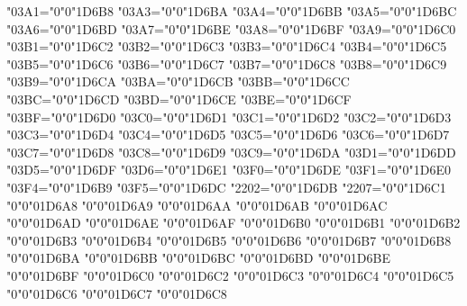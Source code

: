 {    \Umathcode"03A1="0"0"1D6B8%
    \Umathcode"03A3="0"0"1D6BA%
    \Umathcode"03A4="0"0"1D6BB%
    \Umathcode"03A5="0"0"1D6BC%
    \Umathcode"03A6="0"0"1D6BD%
    \Umathcode"03A7="0"0"1D6BE%
    \Umathcode"03A8="0"0"1D6BF%
    \Umathcode"03A9="0"0"1D6C0%
    \Umathcode"03B1="0"0"1D6C2%
    \Umathcode"03B2="0"0"1D6C3%
    \Umathcode"03B3="0"0"1D6C4%
    \Umathcode"03B4="0"0"1D6C5%
    \Umathcode"03B5="0"0"1D6C6%
    \Umathcode"03B6="0"0"1D6C7%
    \Umathcode"03B7="0"0"1D6C8%
    \Umathcode"03B8="0"0"1D6C9%
    \Umathcode"03B9="0"0"1D6CA%
    \Umathcode"03BA="0"0"1D6CB%
    \Umathcode"03BB="0"0"1D6CC%
    \Umathcode"03BC="0"0"1D6CD%
    \Umathcode"03BD="0"0"1D6CE%
    \Umathcode"03BE="0"0"1D6CF%
    \Umathcode"03BF="0"0"1D6D0%
    \Umathcode"03C0="0"0"1D6D1%
    \Umathcode"03C1="0"0"1D6D2%
    \Umathcode"03C2="0"0"1D6D3%
    \Umathcode"03C3="0"0"1D6D4%
    \Umathcode"03C4="0"0"1D6D5%
    \Umathcode"03C5="0"0"1D6D6%
    \Umathcode"03C6="0"0"1D6D7%
    \Umathcode"03C7="0"0"1D6D8%
    \Umathcode"03C8="0"0"1D6D9%
    \Umathcode"03C9="0"0"1D6DA%
    \Umathcode"03D1="0"0"1D6DD%
    \Umathcode"03D5="0"0"1D6DF%
    \Umathcode"03D6="0"0"1D6E1%
    \Umathcode"03F0="0"0"1D6DE%
    \Umathcode"03F1="0"0"1D6E0%
    \Umathcode"03F4="0"0"1D6B9%
    \Umathcode"03F5="0"0"1D6DC%
    \Umathcode"2202="0"0"1D6DB%
    \Umathcode"2207="0"0"1D6C1%
    \Umathchardef\Alpha     "0"0"01D6A8%
    \Umathchardef\Beta      "0"0"01D6A9%
    \Umathchardef\Gamma     "0"0"01D6AA%
    \Umathchardef\Delta     "0"0"01D6AB%
    \Umathchardef\Epsilon   "0"0"01D6AC%
    \Umathchardef\Zeta      "0"0"01D6AD%
    \Umathchardef\Eta       "0"0"01D6AE%
    \Umathchardef\Theta     "0"0"01D6AF%
    \Umathchardef\Iota      "0"0"01D6B0%
    \Umathchardef\Kappa     "0"0"01D6B1%
    \Umathchardef\Lambda    "0"0"01D6B2%
    \Umathchardef\Mu        "0"0"01D6B3%
    \Umathchardef\Nu        "0"0"01D6B4%
    \Umathchardef\Xi        "0"0"01D6B5%
    \Umathchardef\Omicron   "0"0"01D6B6%
    \Umathchardef\Pi        "0"0"01D6B7%
    \Umathchardef\Rho       "0"0"01D6B8%
    \Umathchardef\Sigma     "0"0"01D6BA%
    \Umathchardef\Tau       "0"0"01D6BB%
    \Umathchardef\Upsilon   "0"0"01D6BC%
    \Umathchardef\Phi       "0"0"01D6BD%
    \Umathchardef\Chi       "0"0"01D6BE%
    \Umathchardef\Psi       "0"0"01D6BF%
    \Umathchardef\Omega     "0"0"01D6C0%
    \Umathchardef\alpha     "0"0"01D6C2%
    \Umathchardef\beta      "0"0"01D6C3%
    \Umathchardef\gamma     "0"0"01D6C4%
    \Umathchardef\delta     "0"0"01D6C5%
    \Umathchardef\varepsilon"0"0"01D6C6%
    \Umathchardef\zeta      "0"0"01D6C7%
    \Umathchardef\eta       "0"0"01D6C8%
}
